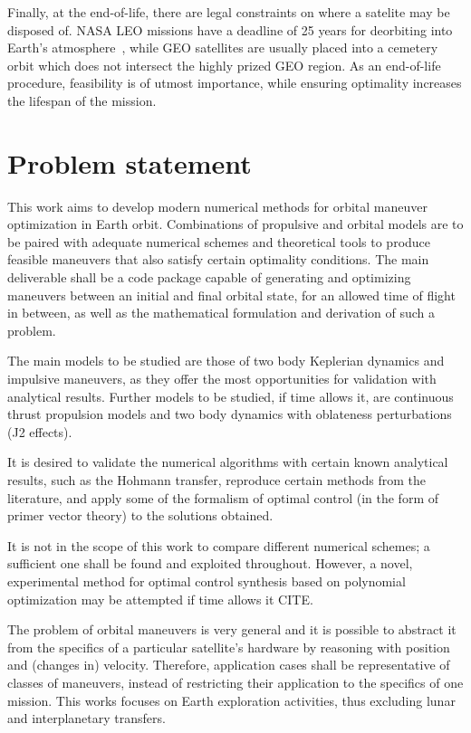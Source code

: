 Finally, at the end-of-life, there are legal constraints on where a satelite may be disposed of. NASA LEO missions have a deadline of 25 years for deorbiting into Earth's atmosphere~\cite{nasa_deorbit}, while GEO satellites are usually placed into a cemetery orbit which does not intersect the highly prized GEO region. As an end-of-life procedure, feasibility is of utmost importance, while ensuring optimality increases the lifespan of the mission.

\section{Problem statement}



This work aims to develop modern numerical methods for orbital maneuver optimization in Earth orbit. Combinations of propulsive and orbital models are to be paired with adequate numerical schemes and theoretical tools to produce feasible maneuvers that also satisfy certain optimality conditions. The main deliverable shall be a code package capable of generating and optimizing maneuvers between an initial and final orbital state, for an allowed time of flight in between, as well as the mathematical formulation and derivation of such a problem.

The main models to be studied are those of two body Keplerian dynamics and impulsive maneuvers, as they offer the most opportunities for validation with analytical results. Further models to be studied, if time allows it, are continuous thrust propulsion models and two body dynamics with oblateness perturbations (J2 effects).

It is desired to validate the numerical algorithms with certain known analytical results, such as the Hohmann transfer, reproduce certain methods from the literature, and apply some of the formalism of optimal control (in the form of primer vector theory) to the solutions obtained. 

It is not in the scope of this work to compare different numerical schemes; a sufficient one shall be found and exploited throughout. However, a novel, experimental method for optimal control synthesis based on polynomial optimization may be attempted if time allows it CITE\@.

The problem of orbital maneuvers is very general and it is possible to abstract it from the specifics of a particular satellite's hardware by reasoning with position and (changes in) velocity. Therefore, application cases shall be representative of classes of maneuvers, instead of restricting their application to the specifics of one mission. This works focuses on Earth exploration activities, thus excluding lunar and interplanetary transfers.


